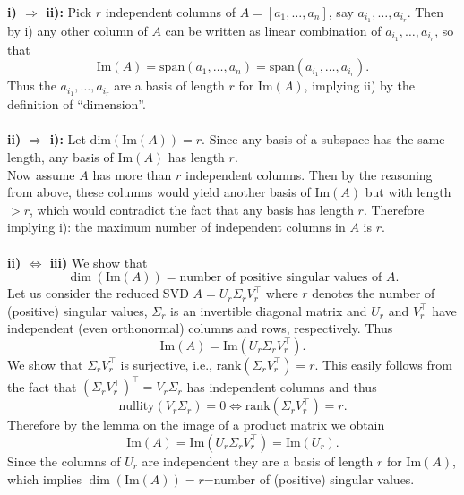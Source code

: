 {\color{solution}
\textbf{i) $\Rightarrow$ ii):} Pick $r$ independent columns of $A = [a_1,\ldots,a_n]$, say $a_{i_1},\ldots,a_{i_r}$. Then by i) any other column of $A$ can be written as linear combination of $a_{i_1},\ldots,a_{i_r}$, so that $$\text{Im}(A)= \text{span}(a_{1},\ldots,a_{n})= \text{span}(a_{i_1},\ldots,a_{i_r}).$$ Thus the $a_{i_1},\ldots,a_{i_r}$ are a basis of length $r$ for $\text{Im}(A)$, implying ii) by the definition of ``dimension''.\\~\\
\textbf{ii) $\Rightarrow$ i):} 
Let $\text{dim}(\text{Im}(A))= r$. Since any basis of a subspace has the same length, any basis of $\text{Im}(A)$ has length $r$.\\
Now assume $A$ has more than $r$ independent columns. Then by the reasoning from above, these columns would yield another basis of $\text{Im}(A)$ but with length $>r$, which would contradict the fact that any basis has length $r$. Therefore implying i): the maximum number of independent columns in $A$ is $r$. \\~\\
\textbf{ii) $\Leftrightarrow$ iii)} We show that $$\dim(\text{Im}(A)) = \text{number of positive singular values of }A .$$
Let us consider the reduced SVD $A = U_r \Sigma_r V_r^\top$ where $r$ denotes the number of (positive) singular values, $\Sigma_r$ is an invertible diagonal matrix and $U_r$ and $V_r^\top$ have independent (even orthonormal) columns and rows, respectively. Thus
$$\text{Im}(A) = \text{Im}(U_r \Sigma_r V_r^\top). $$
We show that $\Sigma_r V_r^\top$ is surjective, i.e., $\text{rank}(\Sigma_r V_r^\top) = r$. This easily follows from the fact that $(\Sigma_r V_r^\top)^\top = V_r\Sigma_r $ has independent columns and thus $$\text{nullity}(V_r\Sigma_r) = 0 \Leftrightarrow \text{rank}(\Sigma_r V_r^\top) = r.$$ Therefore by the lemma on the image of a product matrix we obtain
$$\text{Im}(A) = \text{Im}(U_r \Sigma_r V_r^\top)= \text{Im}(U_r).$$
Since the columns of $U_r$ are independent they are a basis of length $r$ for $\text{Im}(A)$, which implies $\dim(\text{Im}(A))=r$=number of (positive) singular values.

}
